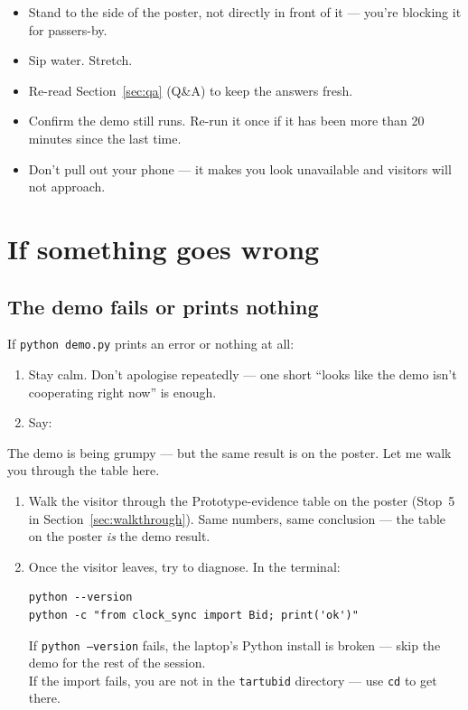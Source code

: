 \documentclass[a4paper,11pt]{article}
\begin{document}
\begin{itemize}[leftmargin=*,nosep]
  \item Stand to the side of the poster, not directly in front of
        it --- you're blocking it for passers-by.
  \item Sip water. Stretch.
  \item Re-read Section~\ref{sec:qa} (Q\&A) to keep the answers
        fresh.
  \item Confirm the demo still runs. Re-run it once if it has
        been more than 20 minutes since the last time.
  \item Don't pull out your phone --- it makes you look unavailable
        and visitors will not approach.
\end{itemize}

\section{If something goes wrong}\label{sec:wrong}

\subsection*{The demo fails or prints nothing}

If \texttt{python demo.py} prints an error or nothing at all:

\begin{enumerate}[leftmargin=*,nosep]
  \item Stay calm. Don't apologise repeatedly --- one short
        ``looks like the demo isn't cooperating right now'' is
        enough.
  \item Say:
\end{enumerate}

\begin{spoken}
The demo is being grumpy --- but the same result is on the
poster. Let me walk you through the table here.
\end{spoken}

\begin{enumerate}[leftmargin=*,nosep,resume]
  \item Walk the visitor through the Prototype-evidence table on
        the poster (Stop~5 in Section~\ref{sec:walkthrough}).
        Same numbers, same conclusion --- the table on the poster
        \emph{is} the demo result.
  \item Once the visitor leaves, try to diagnose. In the
        terminal:
\begin{verbatim}
python --version
python -c "from clock_sync import Bid; print('ok')"
\end{verbatim}
        If \texttt{python --version} fails, the laptop's Python
        install is broken --- skip the demo for the rest of the
        session.\\
        If the import fails, you are not in the
        \texttt{tartubid} directory --- use \texttt{cd} to get
        there.
\end{enumerate}
\end{document}
